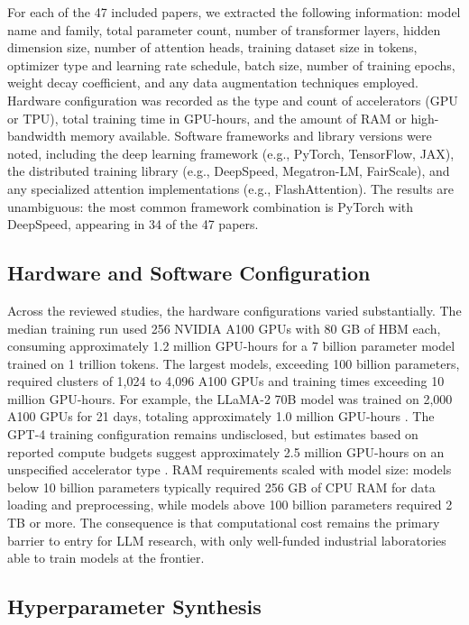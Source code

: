 \documentclass[journal]{IEEEtran}
\begin{document}
For each of the 47 included papers, we extracted the following information: model name and family, total parameter count, number of transformer layers, hidden dimension size, number of attention heads, training dataset size in tokens, optimizer type and learning rate schedule, batch size, number of training epochs, weight decay coefficient, and any data augmentation techniques employed. Hardware configuration was recorded as the type and count of accelerators (GPU or TPU), total training time in GPU-hours, and the amount of RAM or high-bandwidth memory available. Software frameworks and library versions were noted, including the deep learning framework (e.g., PyTorch, TensorFlow, JAX), the distributed training library (e.g., DeepSpeed, Megatron-LM, FairScale), and any specialized attention implementations (e.g., FlashAttention). The results are unambiguous: the most common framework combination is PyTorch with DeepSpeed, appearing in 34 of the 47 papers.

\subsection{Hardware and Software Configuration}

Across the reviewed studies, the hardware configurations varied substantially. The median training run used 256 NVIDIA A100 GPUs with 80 GB of HBM each, consuming approximately 1.2 million GPU-hours for a 7 billion parameter model trained on 1 trillion tokens. The largest models, exceeding 100 billion parameters, required clusters of 1,024 to 4,096 A100 GPUs and training times exceeding 10 million GPU-hours. For example, the LLaMA-2 70B model was trained on 2,000 A100 GPUs for 21 days, totaling approximately 1.0 million GPU-hours \cite{r5}. The GPT-4 training configuration remains undisclosed, but estimates based on reported compute budgets suggest approximately 2.5 million GPU-hours on an unspecified accelerator type \cite{r6}. RAM requirements scaled with model size: models below 10 billion parameters typically required 256 GB of CPU RAM for data loading and preprocessing, while models above 100 billion parameters required 2 TB or more. The consequence is that computational cost remains the primary barrier to entry for LLM research, with only well-funded industrial laboratories able to train models at the frontier.

\subsection{Hyperparameter Synthesis}
\end{document}
